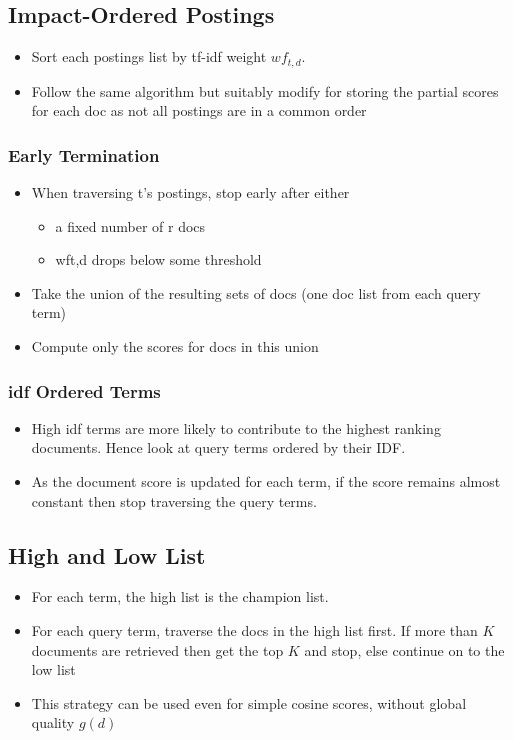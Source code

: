 \documentclass{article}
\begin{document}
\subsection{Impact-Ordered Postings}
\begin{itemize}
    \item Sort each postings list by tf-idf weight $wf_{t,d}$. 
    
    \item Follow the same algorithm but suitably modify for storing the partial scores for each doc as not all postings are in a common order
\end{itemize}
\subsubsection{Early Termination}
\begin{itemize}
    \item When traversing t’s postings, stop early after either
    \begin{itemize}
        \item a fixed number of r docs
        \item wft,d drops below some threshold
    \end{itemize}
    \item Take the union of the resulting sets of docs (one doc list from each query term)
    
    \item Compute only the scores for docs in this union
\end{itemize}

\subsubsection{idf Ordered Terms}
\begin{itemize}
    \item High idf terms are more likely to contribute to the highest ranking documents. Hence look at query terms ordered by their IDF. 
    
    \item As the document score is updated for each term, if the score remains almost constant then stop traversing the query terms. 
\end{itemize}

\subsection{High and Low List}
\begin{itemize}
    \item For each term, the high list is the champion list. 
    
    \item For each query term, traverse the docs in the high list first. If more than $K$ documents are retrieved then get the top $K$ and stop, else continue on to the low list
    
    \item This strategy can be used even for simple cosine scores, without global quality $g(d)$
\end{itemize}
\end{document}
